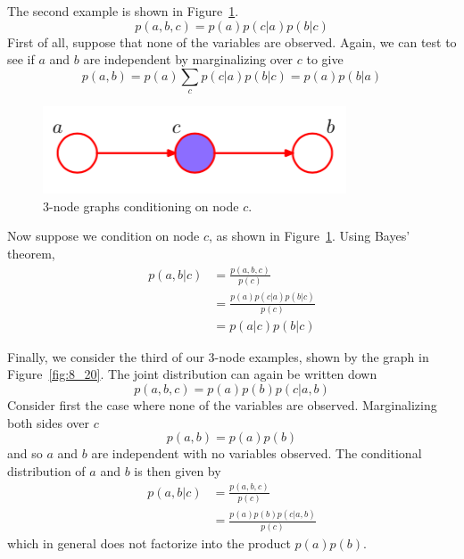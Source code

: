 \documentclass[5p,sort&compress]{elsarticle}
\begin{document}
The second example is shown in Figure~\ref{fig:8_18}.
\begin{equation}
p(a, b, c)=p(a) p(c | a) p(b | c)
\end{equation}
First of all, suppose that none of the variables are observed. Again, we can test to see if $a$ and $b$ are independent by marginalizing over $c$ to give
\begin{equation}
p(a, b)=p(a) \sum_{c} p(c | a) p(b | c)=p(a) p(b | a)
\end{equation}


\begin{figure}[ht]
     \centering
     \includegraphics[width =0.6\linewidth]{figure/figure8_18.png}
     \caption{3-node graphs conditioning on node $c$.}
     \label{fig:8_18}
\end{figure}

Now suppose we condition on node $c$, as shown in Figure~\ref{fig:8_18}. Using Bayes' theorem,
\begin{equation}
\begin{aligned} p(a, b | c) &=\frac{p(a, b, c)}{p(c)} \\ &=\frac{p(a) p(c | a) p(b | c)}{p(c)} \\ &=p(a | c) p(b | c) \end{aligned}
\end{equation}

Finally, we consider the third of our 3-node examples, shown by the graph in Figure~\ref{fig:8_20}. The joint distribution can again be written down
\begin{equation}
p(a, b, c)=p(a) p(b) p(c | a, b)
\end{equation}
Consider first the case where none of the variables are observed. Marginalizing both sides over $c$
\begin{equation}
p(a, b)=p(a) p(b)
\end{equation}
and so $a$ and $b$ are independent with no variables observed. The conditional distribution of $a$ and $b$ is then given by
\begin{equation}
\begin{aligned} p(a, b | c) &=\frac{p(a, b, c)}{p(c)} \\ &=\frac{p(a) p(b) p(c | a, b)}{p(c)} \end{aligned}
\end{equation}
which in general does not factorize into the product $p(a)p(b)$.
\end{document}
